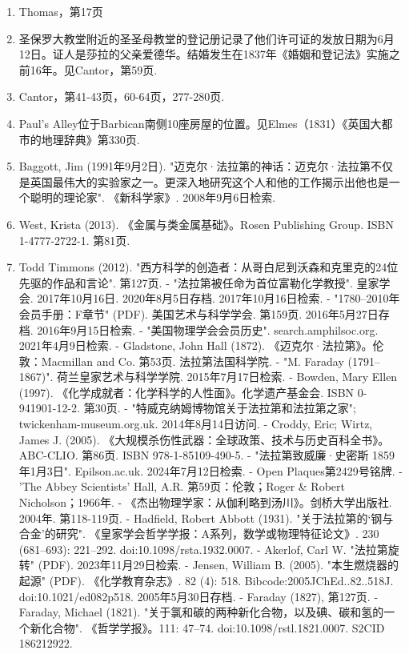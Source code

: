 \begin{enumerate}
\item Thomas，第17页
\item 圣保罗大教堂附近的圣圣母教堂的登记册记录了他们许可证的发放日期为6月12日。证人是莎拉的父亲爱德华。结婚发生在1837年《婚姻和登记法》实施之前16年。见Cantor，第59页.
\item Cantor，第41-43页，60-64页，277-280页.
\item Paul’s Alley位于Barbican南侧10座房屋的位置。见Elmes（1831）《英国大都市的地理辞典》第330页.
\item Baggott, Jim (1991年9月2日). "迈克尔·法拉第的神话：迈克尔·法拉第不仅是英国最伟大的实验家之一。更深入地研究这个人和他的工作揭示出他也是一个聪明的理论家". 《新科学家》. 2008年9月6日检索.
\item West, Krista (2013). 《金属与类金属基础》。Rosen Publishing Group. ISBN 1-4777-2722-1. 第81页.
\item Todd Timmons (2012). "西方科学的创造者：从哥白尼到沃森和克里克的24位先驱的作品和言论". 第127页.
- "法拉第被任命为首位富勒化学教授". 皇家学会. 2017年10月16日. 2020年8月5日存档. 2017年10月16日检索.
- "1780–2010年会员手册：F章节" (PDF). 美国艺术与科学学会. 第159页. 2016年5月27日存档. 2016年9月15日检索.
- "美国物理学会会员历史". search.amphilsoc.org. 2021年4月9日检索.
- Gladstone, John Hall (1872). 《迈克尔·法拉第》。伦敦：Macmillan and Co. 第53页. 法拉第法国科学院.
- "M. Faraday (1791–1867)". 荷兰皇家艺术与科学学院. 2015年7月17日检索.
- Bowden, Mary Ellen (1997). 《化学成就者：化学科学的人性面》。化学遗产基金会. ISBN 0-941901-12-2. 第30页.
- "特威克纳姆博物馆关于法拉第和法拉第之家"; twickenham-museum.org.uk. 2014年8月14日访问.
- Croddy, Eric; Wirtz, James J. (2005). 《大规模杀伤性武器：全球政策、技术与历史百科全书》。ABC-CLIO. 第86页. ISBN 978-1-85109-490-5.
- "法拉第致威廉·史密斯 1859年1月3日". Epilson.ac.uk. 2024年7月12日检索.
- Open Plaques第2429号铭牌.
- 'The Abbey Scientists' Hall, A.R. 第59页：伦敦；Roger & Robert Nicholson；1966年.
- 《杰出物理学家：从伽利略到汤川》。剑桥大学出版社. 2004年. 第118-119页.
- Hadfield, Robert Abbott (1931). "关于法拉第的‘钢与合金’的研究". 《皇家学会哲学学报：A系列，数学或物理特征论文》. 230 (681–693): 221–292. doi:10.1098/rsta.1932.0007.
- Akerlof, Carl W. "法拉第旋转" (PDF). 2023年11月29日检索.
- Jensen, William B. (2005). "本生燃烧器的起源" (PDF). 《化学教育杂志》. 82 (4): 518. Bibcode:2005JChEd..82..518J. doi:10.1021/ed082p518. 2005年5月30日存档.
- Faraday (1827), 第127页.
- Faraday, Michael (1821). "关于氯和碳的两种新化合物，以及碘、碳和氢的一个新化合物". 《哲学学报》。111: 47–74. doi:10.1098/rstl.1821.0007. S2CID 186212922.
\end{enumerate}
